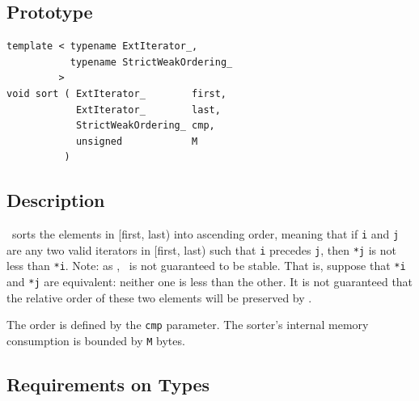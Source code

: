 \documentclass[twoside]{book}
\begin{document}
\subsection*{Prototype}

\begin{lstlisting}
template < typename ExtIterator_, 
           typename StrictWeakOrdering_ 
         >
void sort ( ExtIterator_        first,
            ExtIterator_        last,
            StrictWeakOrdering_ cmp,
            unsigned            M
          )
\end{lstlisting}

\subsection*{Description}

\xsort\ sorts the elements in [first, last) into ascending order,
meaning 
that if \texttt{i} and \texttt{j} are any two valid iterators in
[first, last) such that 
\texttt{i} precedes \texttt{j}, then \texttt{*j} is not less than
\texttt{*i}. Note: as \stdsort, 
\xsort\ is not guaranteed to be stable. That is, suppose that
\texttt{*i} and \texttt{*j} are 
equivalent: neither one is less than the other. It is not guaranteed
that the relative order of these two elements will be preserved by
\xsort. 

The order is defined by the \texttt{cmp} parameter. The sorter's
internal memory consumption is bounded by \texttt{M} bytes.

\subsection*{Requirements on Types}
\end{document}
